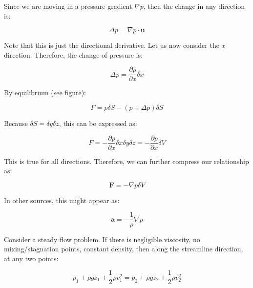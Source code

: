 \documentclass{article}
\begin{document}
Since we are moving in a pressure gradient $\nabla p$, then the change in any direction is:

\[ \Delta p = \nabla p \cdot \mathbf{u} \]

Note that this is just the directional derivative. Let us now consider the $x$ direction. Therefore, the change of pressure is:

\[ \Delta p = \frac{\partial p}{\partial x} \delta x \]

By equilibrium (see figure):

\[ F = p\delta S - (p + \Delta p)\delta S \]

Because $\delta S = \delta y \delta z$, this can be expressed as:

\[ F = -\frac{\partial p}{\partial x}\delta x\delta y\delta z = -\frac{\partial p}{\partial x}\delta V \]

This is true for all directions. Therefore, we can further compress our relationship as:

\[ \mathbf{F} = -\nabla p \delta V \]

In other sources, this might appear as:

\[ \mathbf{a} = -\frac{1}{\rho}\nabla p \]

\begin{proposition}
    Consider a steady flow problem. If there is negligible viscosity, no mixing/stagnation points, constant density, then along the streamline direction, at any two points:

    \[ p_1 + \rho g z_1 + \frac{1}{2}\rho v_1^2 = p_2 + \rho g z_2 + \frac{1}{2}\rho v_2^2 \]
\end{proposition}
\end{document}
